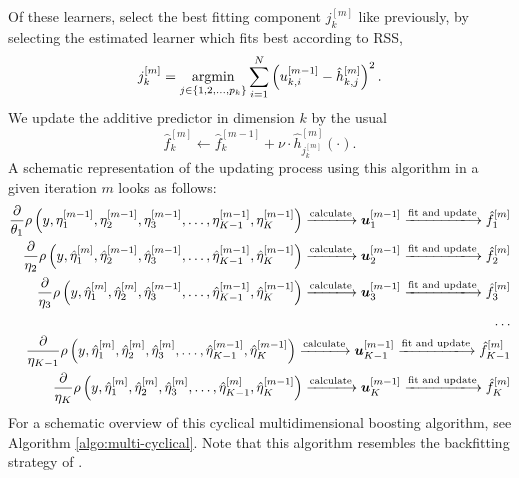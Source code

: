 Of these learners, select the best fitting component $j_k^{[m]}$ like previously, by selecting the estimated learner which fits best according to RSS,
\begin{equation}
    j_k^{[m]}=\operatorname*{argmin}_{j\in\{1,2,\ldots,p_k\}}\sum_{i=1}^N \left(u_{k,i}^{[m-1]}-\hat{h}_{k,j}^{[m]}\right)^2.
\end{equation}
We update the additive predictor in dimension $k$ by the usual
\begin{equation}
    \hat{f}_k^{[m]}\gets\hat{f}_k^{[m-1]}+\nu\cdot \hat{h}^{[m]}_{j_k^{[m]}}(\cdot).
\end{equation}
A schematic representation of the updating process using this algorithm in a given iteration $m$ looks as follows:
\begin{align*}
    \frac{\partial}{\theta_1}\rho\left(y,\eta_1^{[m-1]},\eta_2^{[m-1]},\eta_3^{[m-1]},\ldots,\eta_{K-1}^{[m-1]},\eta_K^{[m-1]}\right)
    \xlongrightarrow{\text{calculate}}\u_{1}^{[m-1]}
    \xlongrightarrow{\text{fit and update}}\hat{f}_{1}^{[m]} \\
    \frac{\partial}{\eta_2}\rho\left(y,\hat{\eta}_1^{[m]},\hat{\eta}_2^{[m-1]},\hat{\eta}_3^{[m-1]},\ldots,\hat{\eta}_{K-1}^{[m-1]},\hat{\eta}_K^{[m-1]}\right)
    \xlongrightarrow{\text{calculate}} \u_{2}^{[m-1]}
    \xlongrightarrow{\text{fit and update}}\hat{f}_{2}^{[m]} \\
    \frac{\partial}{\eta_3}\rho\left(y,\hat{\eta}_1^{[m]},\hat{\eta}_2^{[m]},\hat{\eta}_3^{[m-1]},\ldots,\hat{\eta}_{K-1}^{[m-1]},\hat{\eta}_K^{[m-1]}\right)
    \xlongrightarrow{\text{calculate}}\u_{3}^{[m-1]}
    \xlongrightarrow{\text{fit and update}}\hat{f}_{3}^{[m]} \\
    \ldots\\
    \frac{\partial}{\eta_{K-1}}\rho\left(y,\hat{\eta}_1^{[m]},\hat{\eta}_2^{[m]},\hat{\eta}_3^{[m]},\ldots,\hat{\eta}_{K-1}^{[m-1]},\hat{\eta}_K^{[m-1]}\right)
    \xlongrightarrow{\text{calculate}}\u_{K-1}^{[m-1]}
    \xlongrightarrow{\text{fit and update}}\hat{f}_{K-1}^{[m]} \\
    \frac{\partial}{\eta_K}\rho\left(y,\hat{\eta}_1^{[m]},\hat{\eta}_2^{[m]},\hat{\eta}_3^{[m]},\ldots,\hat{\eta}_{K-1}^{[m]},\hat{\eta}_K^{[m-1]}\right)
    \xlongrightarrow{\text{calculate}}\u_{K}^{[m-1]}
    \xlongrightarrow{\text{fit and update}}\hat{f}_{K}^{[m]}
\end{align*}
For a schematic overview of this cyclical multidimensional boosting algorithm, see Algorithm \ref{algo:multi-cyclical}.
Note that this algorithm resembles the backfitting strategy of \citet{hastie1986}.

